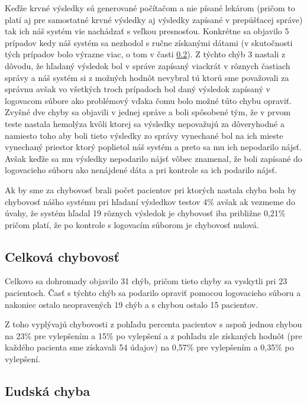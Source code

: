 Keďže krvné výsledky sú generované počítačom a nie písané lekárom (pričom to platí aj pre samostatné krvné výsledky aj výsledky zapísané v prepúšťacej správe) tak ich náš systém vie nachádzať s veľkou presnosťou. Konkrétne sa objavilo 5 prípadov kedy náš systém sa nezhodol s ručne získanými dátami (v skutočnosti tých prípadov bolo výrazne viac, o tom v časti \ref{ludChyba}). Z týchto chýb 3 nastali z dôvodu, že hľadaný výsledok bol v správe zapísaný viackrát v rôznych častiach správy a náš systém si z možných hodnôt nevybral tú ktorú sme považovali za správnu avšak vo všetkých troch prípadoch bol daný výsledok zapísaný v logovacom súbore ako problémový vďaka čomu bolo možné túto chybu opraviť. Zvyšné dve chyby sa objavili v jednej správe a boli spôsobené tým, že v prvom teste nastala hemolýza kvôli ktorej sa výsledky nepovažujú za dôveryhodné a namiesto toho aby boli tieto výsledky zo správy vynechané bol na ich mieste vynechaný priestor ktorý poplietol náš systém a preto sa mu ich nepodarilo nájsť. Avšak keďže sa mu výsledky nepodarilo nájsť vôbec znamenal, že boli zapísané do logovacieho súboru ako nenájdené dáta a pri kontrole sa ich podarilo nájsť.

Ak by sme za chybovosť brali počet pacientov pri ktorých nastala chyba bola by chybovosť nášho systému pri hľadaní výsledkov testov 4\% avšak ak vezmeme do úvahy, že systém hľadal 19 rôznych výsledok je chybovosť iba približne 0,21\% pričom platí, že po kontrole s logovacím súborom je chybovosť nulová.

\subsection{Celková chybovosť}

Celkovo sa dohromady objavilo 31 chýb, pričom tieto chyby sa vyskytli pri 23 pacientoch. Časť s týchto chýb sa podarilo opraviť pomocou logovacieho súboru a nakoniec ostalo neopravených 19 chýb a s chybou ostalo 15 pacientov.

Z toho vyplývajú chybovosti z pohľadu percenta pacientov s aspoň jednou chybou na 23\% pre vylepšením a 15\% po vylepšení a z pohľadu zle získaných hodnôt (pre každého pacienta sme získavali 54 údajov) na 0,57\% pre vylepšením a 0,35\% po vylepšení.

\subsection{Ľudská chyba}
\label{ludChyba}


